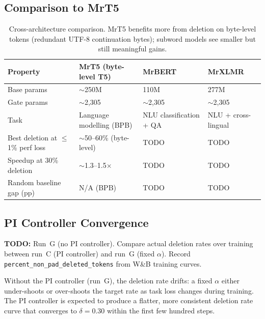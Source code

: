 \documentclass[11pt,a4paper]{article}
\newcommand{\todo}[1]{\begin{mdframed}[style=todostyle]\textcolor{todocolor}{\textbf{TODO:}} #1\end{mdframed}}
\begin{document}
\subsection{Comparison to MrT5}
\label{sec:comparison-mrt5}

\begin{table}[h]
\centering
\small
\begin{tabular}{@{}llll@{}}
\toprule
\textbf{Property} & \textbf{MrT5 (byte-level T5)} & \textbf{MrBERT} & \textbf{MrXLMR} \\
\midrule
Base params                          & $\sim$250M          & 110M & 277M \\
Gate params                          & $\sim$2,305         & $\sim$2,305 & $\sim$2,305 \\
Task                                 & Language modelling (BPB) & NLU classification + QA & NLU + cross-lingual \\
Best deletion at $\leq$1\% perf loss & $\sim$50--60\% (byte-level) & TODO & TODO \\
Speedup at 30\% deletion             & $\sim$1.3--1.5$\times$ & TODO & TODO \\
Random baseline gap (pp)             & N/A (BPB) & TODO & TODO \\
\bottomrule
\end{tabular}
\caption{Cross-architecture comparison. MrT5 benefits more from deletion on byte-level tokens (redundant UTF-8 continuation bytes); subword models see smaller but still meaningful gains.}
\label{tab:comparison-mrt5}
\end{table}


\subsection{PI Controller Convergence}
\label{sec:pi-convergence}

\todo{Run~G (no PI controller). Compare actual deletion rates over training between run~C (PI controller) and run~G (fixed $\alpha$). Record \texttt{percent\_non\_pad\_deleted\_tokens} from W\&B training curves.}

Without the PI controller (run~G), the deletion rate drifts: a fixed $\alpha$ either under-shoots or over-shoots the target rate as task loss changes during training. The PI controller is expected to produce a flatter, more consistent deletion rate curve that converges to $\delta = 0.30$ within the first few hundred steps.


\end{document}
